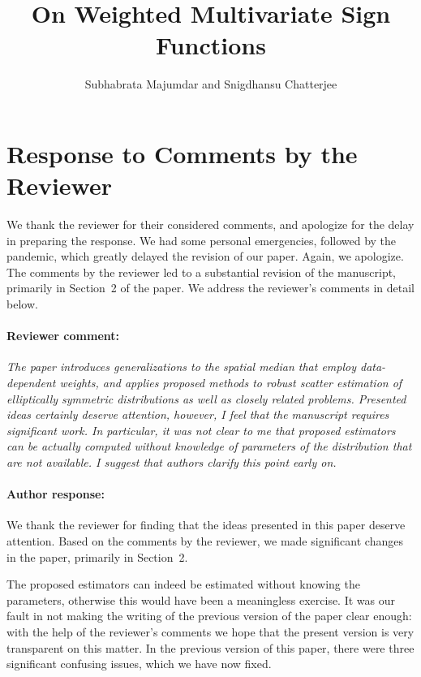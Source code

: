 \documentclass[11pt,letterpaper]{article}
\theoremstyle{definition} \newtheorem{Definition}[Theorem]{Definition}
\begin{document}
\title{On Weighted Multivariate Sign Functions}
\date{}
\author{
Subhabrata Majumdar and Snigdhansu Chatterjee
}
\maketitle

\section*{Response to Comments by the Reviewer}

We thank the reviewer for their considered comments, and apologize for the delay in 
preparing the response. We had some personal emergencies, followed by the pandemic, which greatly delayed the revision of our paper. Again, we apologize. The comments by the reviewer led to a substantial revision of the manuscript, primarily in Section~2 of the paper. We address the reviewer's comments in detail below. 


\paragraph{Reviewer comment:}
\textit{The paper introduces generalizations to the spatial median that employ data-dependent weights, and applies proposed methods to robust scatter estimation of elliptically symmetric distributions as well as closely related problems. Presented ideas certainly deserve attention, however, I feel that the manuscript requires significant work. In particular, it was not clear to me that proposed estimators can be actually computed without knowledge of parameters of the distribution that are not available. I suggest that authors clarify this point early on.}

\paragraph{Author response:} We thank the reviewer for finding that the ideas 
presented in this paper deserve attention. Based on the comments by the reviewer, we made significant changes in the paper, primarily in Section~2. 

The proposed estimators can indeed be estimated without knowing the parameters, otherwise 
this would have been a meaningless exercise. It was our fault in not making the writing of the previous version of the paper clear enough: with the help of the reviewer's comments we hope that the present version is very transparent on this matter. In the previous version of this paper, there were three significant confusing issues, which we have now fixed. 
\end{document}
